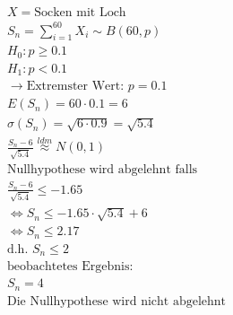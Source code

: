 \begin{align*}
    X = \text{Socken mit Loch}                                \\
    S_n = \sum_{i = 1}^{60} X_i \sim B\left(60, p\right)      \\
    H_0: p \geq 0.1                                           \\
    H_1: p < 0.1                                              \\
    \rightarrow \text{Extremster Wert: } p = 0.1              \\
    E(S_n) = 60 \cdot 0.1 = 6                                 \\
    \sigma(S_n) = \sqrt{6 \cdot 0.9} = \sqrt{5.4}             \\
    \frac{S_n - 6}{\sqrt{5.4}} \overset{ldm}{\approx} N(0, 1) \\
    \text{Nullhypothese wird abgelehnt falls}                 \\
    \frac{S_n - 6}{\sqrt{5.4}} \leq -1.65                     \\
    \Leftrightarrow S_n \leq -1.65 \cdot \sqrt{5.4} + 6       \\
    \Leftrightarrow S_n \leq 2.17                             \\
    \text{d.h. } S_n \leq 2                                   \\
    \text{beobachtetes Ergebnis:}                             \\
    S_n = 4                                                   \\
    \text{Die Nullhypothese wird nicht abgelehnt}
\end{align*}
